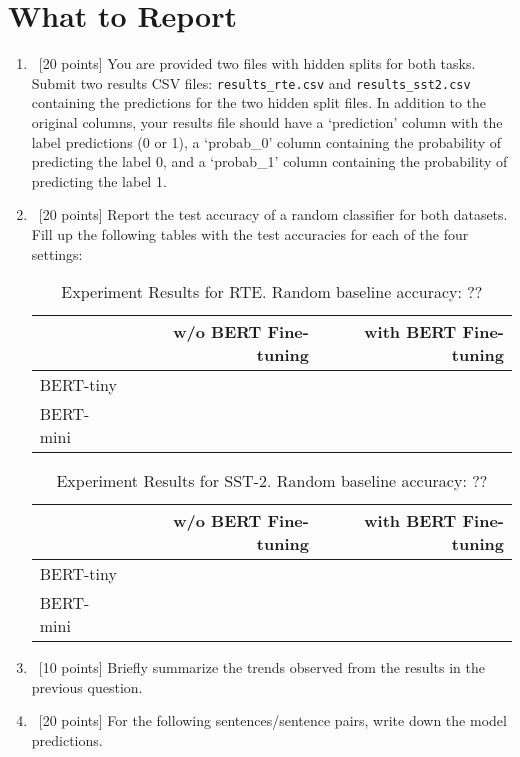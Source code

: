 \section{What to Report}
\begin{enumerate}
    \item~[20 points] You are provided two files with hidden splits for both tasks. Submit two results CSV files: \texttt{results\_rte.csv} and \texttt{results\_sst2.csv} containing the predictions for the two hidden split files. In addition to the original columns, your results file should have a `prediction' column with the label predictions (0 or 1), a `probab\_0' column containing the probability of predicting the label 0, and a `probab\_1' column containing the probability of predicting the label 1.
    \item~[20 points] Report the test accuracy of a random classifier for both datasets. Fill up the following tables with the test accuracies for each of the four settings:
    \begin{table}[h!]
    \centering
    \begin{tabular}{l|r|r}
    & w/o BERT Fine-tuning& with BERT Fine-tuning\\\hline
   BERT-tiny & & \\
   BERT-mini & & \\ \hline
    \end{tabular}
    \caption{Experiment Results for RTE. Random baseline accuracy: ??}
    \label{tab:results}
    \end{table}
    \begin{table}[h!]
    \centering
    \begin{tabular}{l|r|r}
    & w/o BERT Fine-tuning& with BERT Fine-tuning\\\hline
   BERT-tiny & & \\
   BERT-mini & & \\ \hline
    \end{tabular}
    \caption{Experiment Results for SST-2. Random baseline accuracy: ??}
    \label{tab:results}
    \end{table}
    \item~[10 points] Briefly summarize the trends observed from the results in the previous question.
    \item~[20 points] For the following sentences/sentence pairs, write down the model predictions.

\end{enumerate}
